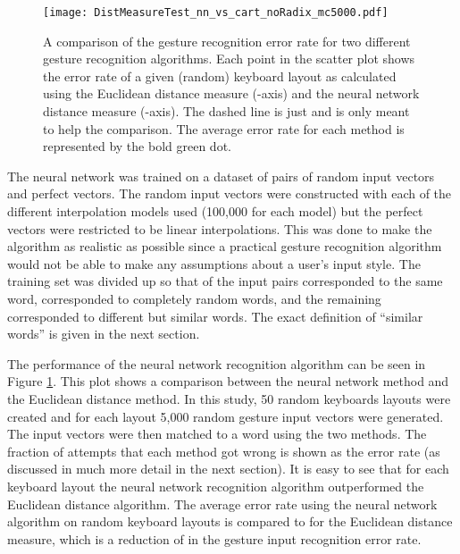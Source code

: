 \documentclass[final,1p,times,authoryear]{elsarticle}
\begin{document}
\begin{figure}[tbh]
\begin{centering}
\texttt{[image: DistMeasureTest\_nn\_vs\_cart\_noRadix\_mc5000.pdf]}
\par\end{centering}
\smallskip{}
\protect\caption{A comparison of the gesture recognition error rate for two 
different gesture recognition algorithms. Each point in the scatter plot shows the
error rate of a given (random) keyboard layout as calculated using the Euclidean distance
measure (-axis) and the neural network distance measure (-axis). The dashed line
is just  and is only meant to help the comparison. The average error rate for each 
method is represented by the bold green dot.\label{fig:The-performance-of-NN}}
\end{figure}

The neural network was trained on a dataset of  pairs of
random input vectors and perfect vectors. The random input vectors
were constructed with each of the different interpolation models used
(100,000 for each model) but the perfect vectors
were restricted to be linear interpolations. This was done to make
the algorithm as realistic as possible since a practical gesture recognition algorithm
would not be able to make any assumptions about a user's input style.
The training set was divided up so that  of the input pairs
corresponded to the same word,  corresponded to completely
random words, and the remaining  corresponded to different
but similar words. The exact definition of ``similar words'' is
given in the next section. 

The performance of the neural network recognition algorithm can be seen in Figure \ref{fig:The-performance-of-NN}.
This plot shows a comparison between the neural network method and the Euclidean distance method.
In this study, 50 random keyboards layouts were created and for each layout 5,000 random gesture input vectors were generated.
The input vectors were then matched to a word using the two methods. 
The fraction of attempts that each method got wrong is shown as the error rate (as discussed in much more detail in the next section).
It is easy to see that for each keyboard layout the neural network recognition algorithm outperformed the Euclidean distance algorithm. 
The average error rate using the neural network algorithm on random  keyboard layouts is  compared to  for the Euclidean distance measure, which is a reduction of  in the gesture input recognition error rate.
\end{document}
